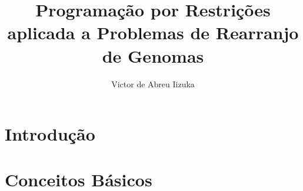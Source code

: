 \documentclass[12pt]{report} %
\begin{document}
  
\title{Programação por Restrições aplicada a Problemas de Rearranjo de
  Genomas}

\author{Victor de Abreu Iizuka}







\copyrightfalse %
%
\finalversionfalse %
%
\tablespagetrue %
%
\figurespagetrue %
%

\beforepreface







\afterpreface %
%

\chapter{Introdução}
\label{cap:intro}


\chapter{Conceitos Básicos}
\label{cap:basic}

\end{document}
